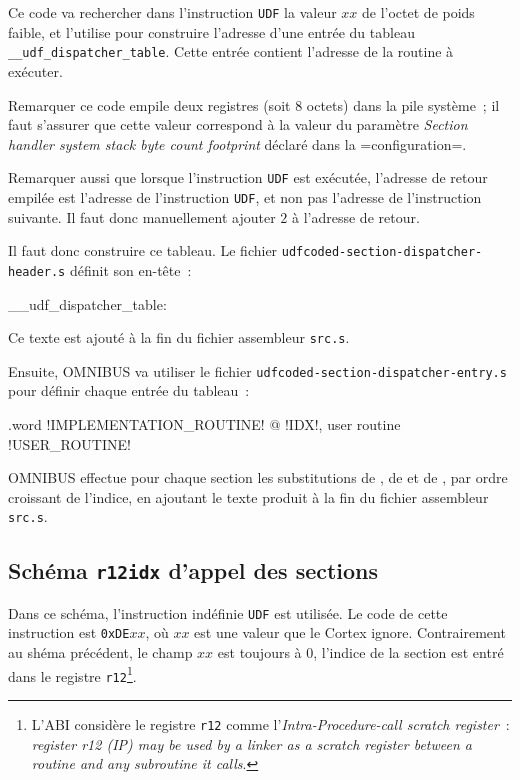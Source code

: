 Ce code va rechercher dans l'instruction \texttt{UDF} la valeur $xx$ de l'octet de poids faible, et l'utilise pour construire l'adresse d'une entrée du tableau \texttt{\_\_udf\_dispatcher\_table}. Cette entrée contient l'adresse de la routine à exécuter.

Remarquer ce code empile deux registres (soit 8 octets) dans la pile système~; il faut s'assurer que cette valeur correspond à la valeur du paramètre \emph{Section handler system stack byte count footprint} déclaré dans la \omnibus=configuration=.

Remarquer aussi que lorsque l'instruction \texttt{UDF} est exécutée, l'adresse de retour empilée est l'adresse de l'instruction \texttt{UDF}, et non pas l'adresse de l'instruction suivante. Il faut donc manuellement ajouter $2$ à l'adresse de retour.

Il faut donc construire ce tableau. Le fichier \texttt{udfcoded-section-dispatcher-header.s} définit son en-tête~:

\begin{SHELL}\small
\_\_udf\_dispatcher\_table:
\end{SHELL}

Ce texte est ajouté à la fin du fichier assembleur \texttt{src.s}.

Ensuite, OMNIBUS va utiliser le fichier \texttt{udfcoded-section-dispatcher-entry.s} pour définir chaque entrée du tableau~:
\begin{SHELL}\small
\hspace*{1.2em}.word !IMPLEMENTATION\_ROUTINE! @ !IDX!, user routine !USER\_ROUTINE!

\end{SHELL}

OMNIBUS effectue pour chaque section les substitutions de , de  et de , par ordre croissant de l'indice, en ajoutant le texte produit à la fin du fichier assembleur \texttt{src.s}.










\subsection{Schéma \texttt{r12idx} d'appel des sections}

Dans ce schéma, l'instruction indéfinie \texttt{UDF} est utilisée.  Le code de cette instruction est \texttt{0xDE$xx$}, où $xx$ est une valeur que le Cortex ignore. Contrairement au shéma précédent, le champ $xx$ est toujours à $0$, l'indice de la section est entré dans le registre \texttt{r12}\footnote{L'ABI considère le registre \texttt{r12} comme l'\emph{Intra-Procedure-call scratch register}~: \emph{register r12 (IP) may be used by a linker as a scratch register between a routine and any subroutine it calls}.}.

